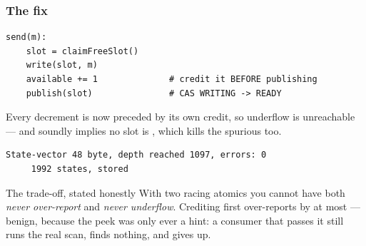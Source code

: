 \begin{frame}[fragile]
  \frametitle{The fix} \small

\begin{lstlisting}[style=shell]
send(m):
    slot = claimFreeSlot()
    write(slot, m)
    available += 1              # credit it BEFORE publishing
    publish(slot)               # CAS WRITING -> READY
\end{lstlisting}

\vspace{0.1cm}

Every decrement is now preceded by its own credit, so underflow is unreachable
--- and  soundly implies no slot is , which
kills the spurious  too.

\vspace{0.2cm}

\begin{lstlisting}[style=shell]
State-vector 48 byte, depth reached 1097, errors: 0
     1992 states, stored
\end{lstlisting}

\pause
\vspace{0.15cm}

\begin{block}{The trade-off, stated honestly}\small
With two racing atomics you cannot have both {\em never over-report} and {\em
never underflow}. Crediting first over-reports by at most  --- benign,
because the peek was only ever a hint: a consumer that passes it still runs the
real scan, finds nothing, and gives up.
\end{block}

\end{frame}

